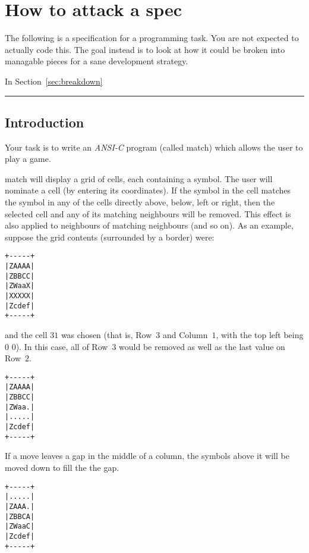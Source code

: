 
\chapter{How to attack a spec}


The following is a specification for a programming task.
You are not expected to actually code this.
The goal instead is to look at how it could be broken into managable pieces 
for a sane development strategy.

In Section~\ref{sec:breakdown}

\hrule

\section{Introduction}
Your task is to write an \emph{ANSI-C} program (called match) which
allows the user to play a game.

match will display a grid of cells, each containing a symbol.
The user will nominate a cell (by entering its coordinates).
If the symbol in the cell matches the symbol in
any of the cells directly above, below, left or right, then the selected cell and any of its matching neighbours
will be removed.
This effect is also applied to neighbours of matching neighbours (and so on).
As an example, suppose the grid contents (surrounded by a border) were:

\begin{center}
\begin{verbatim}
+-----+
|ZAAAA|
|ZBBCC|
|ZWaaX|
|XXXXX|
|Zcdef|
+-----+
\end{verbatim}
\end{center}
and the cell $3 1$ was chosen (that is, Row~$3$ and Column~$1$, with the top left being $0$ $0$).
In this case, all of Row~$3$ would be removed as well as the last value on Row~$2$.

\pagebreak
\begin{center}
\begin{verbatim}
+-----+
|ZAAAA|
|ZBBCC|
|ZWaa.|
|.....|
|Zcdef|
+-----+
\end{verbatim}
\end{center}

If a move leaves a gap in the middle of a column, the symbols above it will be moved down to fill the
the gap.

\begin{center}
\begin{verbatim}
+-----+
|.....|
|ZAAA.|
|ZBBCA|
|ZWaaC|
|Zcdef|
+-----+
\end{verbatim}
\end{center}

